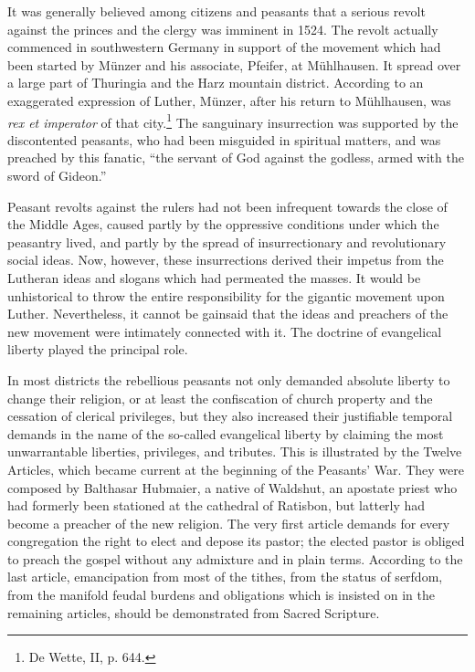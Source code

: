 It was generally believed among citizens and peasants that a serious
revolt against the princes and the clergy was imminent in 1524.
The revolt actually commenced in southwestern Germany in support of the
movement which had been started by Münzer and his
associate, Pfeifer, at Mühlhausen. It spread over a large part of
Thuringia and the Harz mountain district. According to an exaggerated
expression of Luther, Münzer, after his return to Mühlhausen,
was \textit{rex et imperator} of that city.\footnote{De Wette, II, p. 644.}
The sanguinary insurrection
was supported by the discontented peasants, who had been misguided
in spiritual matters, and was preached by this fanatic, “the servant of
God against the godless, armed with the sword of Gideon.”

Peasant revolts against the rulers had not been infrequent towards
the close of the Middle Ages, caused partly by the oppressive conditions
under which the peasantry lived, and partly by the spread
of insurrectionary and revolutionary social ideas. Now, however,
these insurrections derived their impetus from the Lutheran ideas
and slogans which had permeated the masses. It would be unhistorical
to throw the entire responsibility for the gigantic movement upon
Luther. Nevertheless, it cannot be gainsaid that the ideas and preachers
of the new movement were intimately connected with it. The
doctrine of evangelical liberty played the principal role.

In most districts the rebellious peasants not only demanded absolute
liberty to change their religion, or at least the confiscation of
church property and the cessation of clerical privileges, but they also
increased their justifiable temporal demands in the name of the so-called
evangelical liberty by claiming the most unwarrantable liberties, privileges,
and tributes. This is illustrated by the Twelve
Articles, which became current at the beginning of the Peasants’
War. They were composed by Balthasar Hubmaier, a native of Waldshut, an
apostate priest who had formerly been stationed at the cathedral of Ratisbon,
but latterly had become a preacher of the new
religion. The very first article demands for every congregation the
right to elect and depose its pastor; the elected pastor is obliged to
preach the gospel without any admixture and in plain terms. According
to the last article, emancipation from most of the tithes,
from the status of serfdom, from the manifold feudal burdens and
obligations which is insisted on in the remaining articles, should be
demonstrated from Sacred Scripture.

